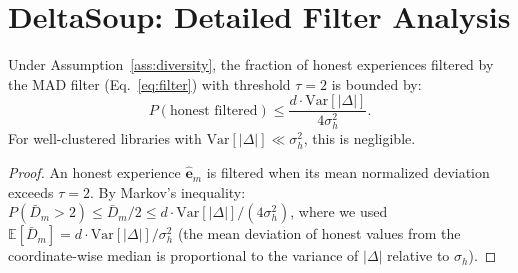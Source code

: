 \section{DeltaSoup: Detailed Filter Analysis}

\label{app:filter-analysis}

\begin{proposition}
\label{prop:fpr}
Under Assumption~\ref{ass:diversity}, the fraction of honest experiences
filtered by the MAD filter (Eq.~\ref{eq:filter}) with threshold $\tau = 2$
is bounded by:
\begin{equation}
    P(\text{honest filtered}) \leq \frac{d \cdot \mathrm{Var}[|\Delta|]}{4 \sigma_h^2}.
\end{equation}
For well-clustered libraries with $\mathrm{Var}[|\Delta|] \ll \sigma_h^2$,
this is negligible.
\end{proposition}

\begin{proof}
An honest experience $\hat{\bm{e}}_m$ is filtered when its mean normalized
deviation exceeds $\tau = 2$. By Markov's inequality:
$P(\bar{D}_m > 2) \leq \bar{D}_m / 2 \leq d \cdot \mathrm{Var}[|\Delta|] / (4 \sigma_h^2)$,
where we used $\mathbb{E}[\bar{D}_m] = d \cdot \mathrm{Var}[|\Delta|] / \sigma_h^2$
(the mean deviation of honest values from the coordinate-wise median is
proportional to the variance of $|\Delta|$ relative to $\sigma_h$).
\end{proof}

